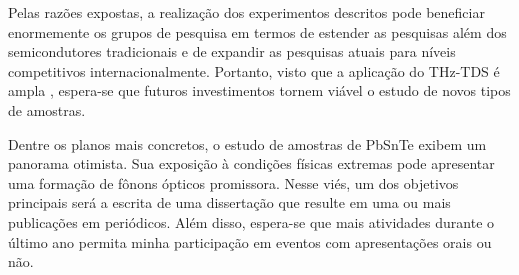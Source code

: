 \documentclass[a4paper,12pt,oneside]{article}
\begin{document}
Pelas razões expostas, a realização dos experimentos descritos pode beneficiar enormemente os grupos de pesquisa em termos de estender as pesquisas além dos semicondutores tradicionais e de expandir as pesquisas atuais para níveis competitivos internacionalmente. Portanto, visto que a aplicação do THz-TDS é ampla \cite{Leitenstorfer2023}, espera-se que futuros investimentos tornem viável o estudo de novos tipos de amostras.

Dentre os planos mais concretos, o estudo de amostras de PbSnTe exibem um panorama otimista. Sua exposição à condições físicas extremas pode apresentar uma formação de fônons ópticos promissora. Nesse viés, um dos objetivos principais será a escrita de uma dissertação que resulte em uma ou mais publicações em periódicos. Além disso, espera-se que mais atividades durante o último ano permita minha participação em eventos com apresentações orais ou não.  

\clearpage

\printbibliography
\end{document}
